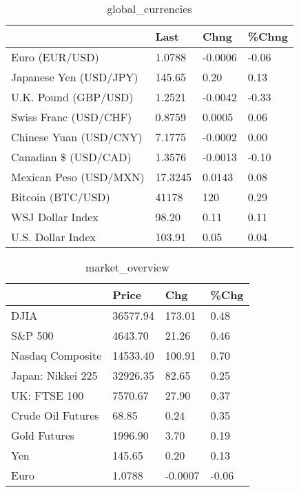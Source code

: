 \documentclass{article}%
\begin{document}
%


\begin{table}[htbp]%
\caption{global\_currencies}%
\centering%
\begin{adjustbox}{width=1\textwidth}%
\begin{tabular}{llll}
\toprule
                       &    Last &    Chng & \%Chng \\
\midrule
        Euro (EUR/USD) &  1.0788 & -0.0006 & -0.06 \\
Japanese Yen (USD/JPY) &  145.65 &    0.20 &  0.13 \\
  U.K. Pound (GBP/USD) &  1.2521 & -0.0042 & -0.33 \\
 Swiss Franc (USD/CHF) &  0.8759 &  0.0005 &  0.06 \\
Chinese Yuan (USD/CNY) &  7.1775 & -0.0002 &  0.00 \\
  Canadian \$ (USD/CAD) &  1.3576 & -0.0013 & -0.10 \\
Mexican Peso (USD/MXN) & 17.3245 &  0.0143 &  0.08 \\
     Bitcoin (BTC/USD) &   41178 &     120 &  0.29 \\
      WSJ Dollar Index &   98.20 &    0.11 &  0.11 \\
     U.S. Dollar Index &  103.91 &    0.05 &  0.04 \\
\bottomrule
\end{tabular}
%
\end{adjustbox}%
\end{table}

%


\begin{table}[htbp]%
\caption{market\_overview}%
\centering%
\begin{adjustbox}{width=1\textwidth}%
\begin{tabular}{llll}
\toprule
                  &    Price &     Chg &  \%Chg \\
\midrule
             DJIA & 36577.94 &  173.01 &  0.48 \\
          S\&P 500 &  4643.70 &   21.26 &  0.46 \\
 Nasdaq Composite & 14533.40 &  100.91 &  0.70 \\
Japan: Nikkei 225 & 32926.35 &   82.65 &  0.25 \\
     UK: FTSE 100 &  7570.67 &   27.90 &  0.37 \\
Crude Oil Futures &    68.85 &    0.24 &  0.35 \\
     Gold Futures &  1996.90 &    3.70 &  0.19 \\
              Yen &   145.65 &    0.20 &  0.13 \\
             Euro &   1.0788 & -0.0007 & -0.06 \\
\bottomrule
\end{tabular}
%
\end{adjustbox}%
\end{table}

%
\end{document}
